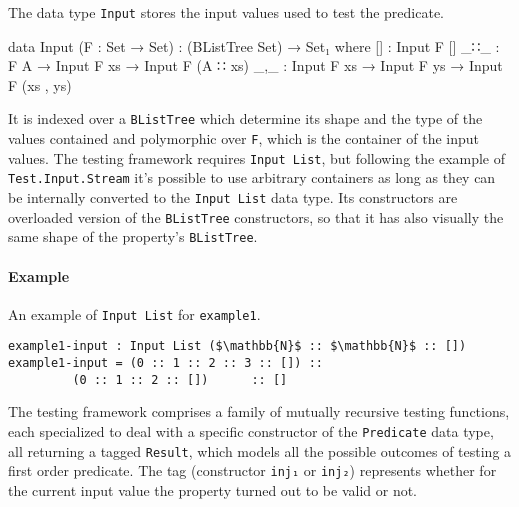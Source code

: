 \documentclass[10pt,a4paper]{article}
\begin{document}
The data type \texttt{Input} stores the input values used to test the predicate.
\begin{code}
data Input (F : Set → Set) : (BListTree Set) → Set₁ where
  [] : Input F []
  _∷_ : F A → Input F xs → Input F (A ∷ xs)
  _,_ : Input F xs → Input F ys → Input F (xs , ys)
\end{code}
It is indexed over a \texttt{BListTree} which determine its shape and the type of the values contained and polymorphic over \texttt{F}, which is the container of the input values.
The testing framework requires \texttt{Input List}, but following the example of \texttt{Test.Input.Stream} it's possible to use arbitrary containers as long as they can be internally converted to the \texttt{Input List} data type.
Its constructors are overloaded version of the \texttt{BListTree} constructors, so that it has also visually the same shape of the property's \texttt{BListTree}.
\paragraph{Example} An example of \texttt{Input List} for \texttt{example1}.
\begin{lstlisting}
example1-input : Input List ($\mathbb{N}$ :: $\mathbb{N}$ :: [])
example1-input = (0 :: 1 :: 2 :: 3 :: []) :: 
		 (0 :: 1 :: 2 :: [])      :: []
\end{lstlisting}


The testing framework comprises a family of mutually recursive testing functions, each specialized to deal with a specific constructor of the \texttt{Predicate} data type, all returning a tagged \texttt{Result}, which models all the possible outcomes of testing a first order predicate. 
The tag (constructor \texttt{inj₁} or \texttt{inj₂}) represents whether for the current input value the property turned out to be valid or not.
\end{document}
